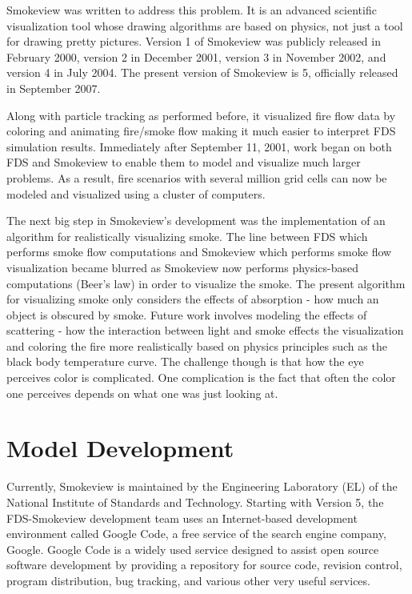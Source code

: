 \documentclass[11pt,twoside]{book}
\begin{document}
Smokeview was written to address this problem. It is an advanced scientific visualization tool whose drawing algorithms are based on physics, not just a tool for drawing pretty pictures. Version 1 of Smokeview was publicly released in February 2000, version 2 in December 2001, version 3 in November 2002, and version 4 in July 2004. The present version of Smokeview is 5, officially released in September 2007.

Along with particle tracking as performed before, it visualized fire flow data by coloring and animating fire/smoke flow making it much easier to interpret FDS simulation results.  Immediately after September 11, 2001, work began on both FDS and Smokeview to enable them to model and visualize much larger problems.  As a result, fire scenarios with several million grid cells can now be modeled and visualized using a cluster of computers.

The next big step in Smokeview's development was the implementation of an algorithm for realistically visualizing smoke. The line between FDS which performs smoke flow computations and Smokeview which performs smoke flow visualization became blurred as Smokeview now performs physics-based computations (Beer's law) in order to visualize the smoke.  The present algorithm for visualizing smoke only considers the effects of absorption - how much an object is obscured by smoke.  Future work involves modeling the effects of scattering - how the interaction between light and smoke effects the visualization and coloring the fire more realistically based on physics principles such as the black body temperature curve.  The challenge though is that how the eye perceives color is complicated.  One complication is the fact that often the color one perceives depends on what one was just looking at.

%
%

\section{Model Development}
Currently, Smokeview is maintained by the Engineering Laboratory (EL) of the National Institute of Standards and Technology. Starting with Version 5, the FDS-Smokeview development team uses an Internet-based development environment called Google Code, a free service of the search engine company, Google. Google Code is a widely used service designed to assist open source software development by providing a repository for source code, revision control, program distribution, bug tracking, and various other very useful services.
\end{document}
